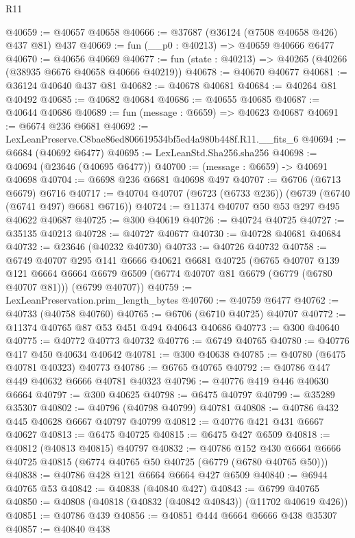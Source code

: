 \begin{lexlean}{R11}
\begin{coremodule}
@40659 := @40657 @40658
@40666 := @37687 (@36124 (@7508 @40658 @426) @437 @81) @437
@40669 := fun (__p0 : @40213) => @40659 @40666 @6477
@40670 := @40656 @40669
@40677 := fun (state : @40213) => @40265 (@40266 (@38935 @6676 @40658 @40666 @40219))
@40678 := @40670 @40677
@40681 := @36124 @40640 @437 @81
@40682 := @40678 @40681
@40684 := @40264 @81 @40492
@40685 := @40682 @40684
@40686 := @40655 @40685
@40687 := @40644 @40686
@40689 := fun (message : @6659) => @40623 @40687
@40691 := @6674 @236 @6681
@40692 := LexLeanPreserve.C8bae86ed806619534bf5ed4a980b448f.R11.__fits_6
@40694 := @6684 (@40692 @6477)
@40695 := LexLeanStd.Sha256.sha256
@40698 := @40694 (@23646 (@40695 @6477))
@40700 := (message : @6659) -> @40691 @40698
@40704 := @6698 @236 @6681 @40698 @497
@40707 := @6706 (@6713 @6679) @6716
@40717 := @40704 @40707 (@6723 (@6733 @236)) (@6739 (@6740 (@6741 @497) @6681 @6716))
@40724 := @11374 @40707 @50 @53 @297 @495 @40622 @40687
@40725 := @300 @40619
@40726 := @40724 @40725
@40727 := @35135 @40213
@40728 := @40727 @40677
@40730 := @40728 @40681 @40684
@40732 := @23646 (@40232 @40730)
@40733 := @40726 @40732
@40758 := @6749
    @40707
    @295
    @141
    @6666
    @40621
    @6681
    @40725
    (@6765
      @40707
      @139
      @121
      @6664
      @6664
      @6679
      @6509
      (@6774 @40707 @81 @6679 (@6779 (@6780 @40707 @81)))
      (@6799 @40707))
@40759 := LexLeanPreservation.prim_length_bytes
@40760 := @40759 @6477
@40762 := @40733 (@40758 @40760)
@40765 := @6706 (@6710 @40725) @40707
@40772 := @11374 @40765 @87 @53 @451 @494 @40643 @40686
@40773 := @300 @40640
@40775 := @40772 @40773 @40732
@40776 := @6749 @40765
@40780 := @40776 @417 @450 @40634 @40642
@40781 := @300 @40638
@40785 := @40780 (@6475 @40781 @40323) @40773
@40786 := @6765 @40765
@40792 := @40786 @447 @449 @40632 @6666 @40781 @40323
@40796 := @40776 @419 @446 @40630 @6664
@40797 := @300 @40625
@40798 := @6475 @40797
@40799 := @35289 @35307
@40802 := @40796 (@40798 @40799) @40781
@40808 := @40786 @432 @445 @40628 @6667 @40797 @40799
@40812 := @40776 @421 @431 @6667 @40627
@40813 := @6475 @40725
@40815 := @6475 @427 @6509
@40818 := @40812 (@40813 @40815) @40797
@40832 := @40786
    @152
    @430
    @6664
    @6666
    @40725
    @40815
    (@6774 @40765 @50 @40725 (@6779 (@6780 @40765 @50)))
@40838 := @40786 @428 @121 @6664 @6664 @427 @6509
@40840 := @6944 @40765 @53
@40842 := @40838 (@40840 @427)
@40843 := @6799 @40765
@40850 := @40808 (@40818 (@40832 (@40842 @40843)) (@11702 @40619 @426))
@40851 := @40786 @439
@40856 := @40851 @444 @6664 @6666 @438 @35307
@40857 := @40840 @438

\end{coremodule}
\end{lexlean}
